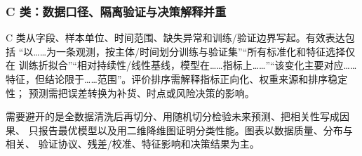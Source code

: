 \subsubsection{C 类：数据口径、隔离验证与决策解释并重}

C 类从字段、样本单位、时间范围、缺失异常和训练/验证边界写起。有效表达包括
“以……为一条观测，按主体/时间划分训练与验证集”“所有标准化和特征选择仅在
训练折拟合”“相对持续性/线性基线，模型在……指标上……”“该变化主要对应……
特征，但结论限于……范围”。评价排序需解释指标正向化、权重来源和排序稳定性；
预测需把误差转换为补货、时点或风险决策的影响。

需要避开的是全数据清洗后再切分、用随机切分检验未来预测、把相关性写成因果、
只报告最优模型以及用二维降维图证明分类性能。图表以数据质量、分布与相关、
验证协议、残差/校准、特征影响和决策结果为主。

